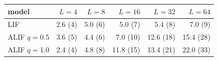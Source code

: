 \begin{tabular}{lrrrrr}
\toprule
model & $L=4$ & $L=8$ & $L=16$ & $L=32$ & $L=64$\\
\midrule
LIF & 2.6 (4) & 5.0 (6) & 5.0 (7) & 5.4 (8) & 7.0 (9)\\
ALIF $q=$0.5 & 3.6 (5) & 4.4 (6) & 7.0 (10) & 12.6 (18) & 15.4 (28)\\
ALIF $q=$1.0 & 2.4 (4) & 4.8 (8) & 11.8 (15) & 13.4 (21) & 22.0 (33)\\
\bottomrule
\end{tabular}
